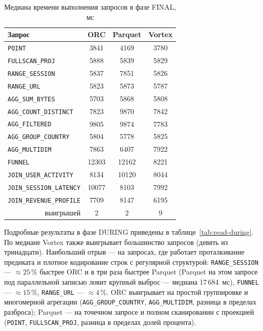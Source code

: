\begin{table}
    \caption{Медиана времени выполнения запросов в фазе FINAL, мс}
    \label{tab:read-final}
    \begin{tabularx}{\textwidth}{|X|c|c|c|}\hline
    \textbf{Запрос} & \textbf{ORC} & \textbf{Parquet} & \textbf{Vortex} \\ \hline
    \texttt{POINT}                  & 3841  & 4169  & 3780 \\ \hline
    \texttt{FULLSCAN\_PROJ}          & 5888  & 5839  & 5829 \\ \hline
    \texttt{RANGE\_SESSION}          & 5837  & 7851  & 5826 \\ \hline
    \texttt{RANGE\_URL}              & 5823  & 5873  & 5787 \\ \hline
    \texttt{AGG\_SUM\_BYTES}         & 5703  & 5868  & 5808 \\ \hline
    \texttt{AGG\_COUNT\_DISTINCT}    & 7823  & 9870  & 7842 \\ \hline
    \texttt{AGG\_FILTERED}           & 9805  & 9874  & 7783 \\ \hline
    \texttt{AGG\_GROUP\_COUNTRY}     & 5804  & 5778  & 5825 \\ \hline
    \texttt{AGG\_MULTIDIM}           & 7863  & 6407  & 7922 \\ \hline
    \texttt{FUNNEL}                  & 12303 & 12162 & 8221 \\ \hline
    \texttt{JOIN\_USER\_ACTIVITY}    & 8134  & 10120 & 8044 \\ \hline
    \texttt{JOIN\_SESSION\_LATENCY}  & 10077 & 8103  & 7992 \\ \hline
    \texttt{JOIN\_REVENUE\_PROFILE}  & 7709  & 8147  & 6195 \\ \hline
    \multicolumn{1}{|r|}{выигрышей} & 2 & 2 & 9 \\ \hline
    \end{tabularx}
\end{table}

Подробные результаты в фазе DURING приведены в таблице~\ref{tab:read-during}. По медиане Vortex также выигрывает большинство
запросов (девять из тринадцати). Наибольший отрыв --- на запросах, где работает
проталкивание предиката и плотное кодирование строк с регулярной структурой:
\texttt{RANGE\_SESSION} --- $\approx 25\,\%$ быстрее ORC и в три раза быстрее
Parquet (Parquet на этом запросе под параллельной записью ловит крупный выброс ---
медиана 17\,684~мс), \texttt{FUNNEL} --- $\approx 15\,\%$, \texttt{RANGE\_URL} ---
$\approx 4\,\%$. ORC выигрывает на простой группировке и многомерной агрегации
(\texttt{AGG\_GROUP\_COUNTRY}, \texttt{AGG\_MULTIDIM}, разница в пределах разброса);
Parquet --- на точечном запросе и полном сканировании с проекцией
(\texttt{POINT}, \texttt{FULLSCAN\_PROJ}, разница в пределах долей процента).

